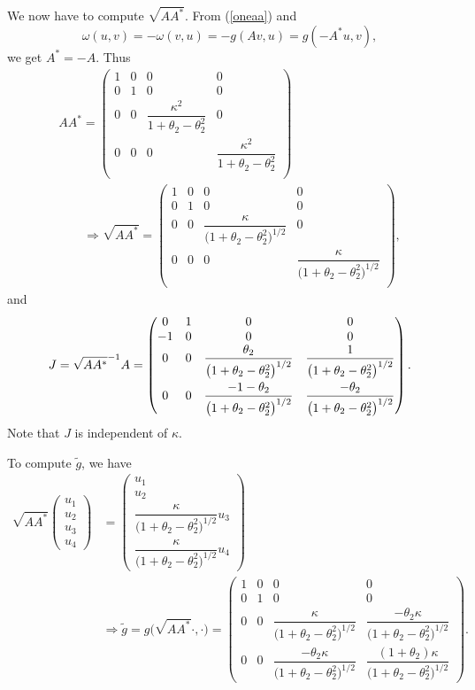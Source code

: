 \documentclass[pdftex]{sigma}
\numberwithin{equation}{section}
\theoremstyle{definition}
\newcommand{\tg}{\tilde g}
\begin{document}
We now have to compute $\sqrt{AA^*}$. From (\ref{oneaa}) and
\[\omega(u,v) = -\omega(v,u) = -g(Av,u) = g(-A^*u,v),\]
we get $A^* = -A$. Thus
\begin{gather*}
AA^* =
\begin{pmatrix} 1&0&0&0\\ 0&1&0&0\\
0&0& \dfrac{\kappa^2}{1+\theta_2-\theta_2^2}&0\\
0&0&0&\dfrac{\kappa^2}{1+\theta_2-\theta_2^2}\\
\end{pmatrix}\\
\qquad
\Longrightarrow \sqrt{AA^*} =
 \begin{pmatrix}1&0&0&0\\ 0&1&0&0\\
0&0& \dfrac{\kappa}{\bigl(1+\theta_2-\theta_2^2\bigr)^{1/2}}&0\\
0&0&0&\dfrac{\kappa}{\bigl(1+\theta_2-\theta_2^2\bigr)^{1/2}}\\
\end{pmatrix},
\end{gather*}
and{\samepage
\begin{equation*}%
J = \sqrt{AA^*}^{-1}A =
\begin{pmatrix} 0&1&0&0\\
-1&0&0&0\\
0&0& \dfrac{\theta_2}{\bigl(1+\theta_2-\theta_2^2\bigr)^{1/2}}& \dfrac{1}{\bigl(1+\theta_2-\theta_2^2\bigr)^{1/2}}\vspace{1mm}\\
0&0&\dfrac{-1-\theta_2}{\bigl(1+\theta_2-\theta_2^2\bigl)^{1/2}}&\dfrac{-\theta_2}{\bigl(1+\theta_2-\theta_2^2\bigr)^{1/2}}
\end{pmatrix}.
\end{equation*}
Note that $J$ is independent of $\kappa$.}

To compute $\tg$, we have
\begin{align*}%
\sqrt{AA^*}\begin{pmatrix} u_1\\u_2\\u_3\\u_4\end{pmatrix} &= \begin{pmatrix} u_1\\u_2\\
\dfrac{\kappa}{\bigl(1+\theta_2-\theta_2^2\bigr)^{1/2}}u_3 \\
\dfrac{\kappa}{\bigl(1+\theta_2-\theta_2^2\bigr)^{1/2}}u_4
\end{pmatrix} \\
&\Longrightarrow \tg = g\bigl(\sqrt{AA^*}\cdot,\cdot\bigr) = \begin{pmatrix} 1&0&0&0\\
0&1&0&0\\
0&0& \dfrac{\kappa}{\bigl(1+\theta_2-\theta_2^2\bigr)^{1/2}}& \dfrac{-\theta_2\kappa}{\bigl(1+\theta_2-\theta_2^2\bigr)^{1/2}}\\[2mm]
0&0&\dfrac{-\theta_2\kappa}{\bigl(1+\theta_2-\theta_2^2\bigr)^{1/2}}& \dfrac{(1+\theta_2)\kappa}{\bigl(1+\theta_2-\theta_2^2\bigr)^{1/2}}
\end{pmatrix}.
\end{align*}
\end{document}
